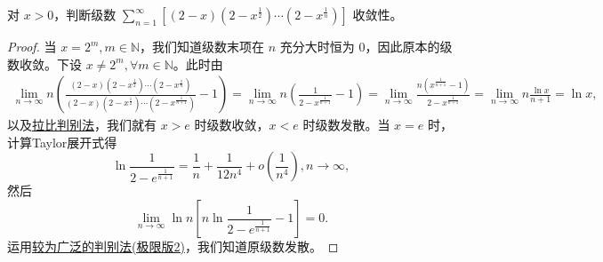 \documentclass[../../main.tex]{subfiles}
\begin{document}
\begin{example}
对 \( x > 0 \)，判断级数 \( \sum_{n = 1}^{\infty} \left[ (2 - x) \left( 2 - x^{\frac{1}{2}} \right) \cdots \left( 2 - x^{\frac{1}{n}} \right) \right] \) 收敛性。
\end{example}
\begin{proof}
当 \( x = 2^m, m \in \mathbb{N} \)，我们知道级数末项在 \( n \) 充分大时恒为 0，因此原本的级数收敛。下设 \( x \neq 2^m, \forall m \in \mathbb{N} \)。此时由
\begin{align*}
\lim_{n \to \infty} n \left( \frac{(2 - x) \left( 2 - x^{\frac{1}{2}} \right) \cdots \left( 2 - x^{\frac{1}{n}} \right)}{(2 - x) \left( 2 - x^{\frac{1}{2}} \right) \cdots \left( 2 - x^{\frac{1}{n + 1}} \right)} - 1 \right) = \lim_{n \to \infty} n \left( \frac{1}{2 - x^{\frac{1}{n + 1}}} - 1 \right)= \lim_{n \to \infty} \frac{n \left( x^{\frac{1}{n + 1}} - 1 \right)}{2 - x^{\frac{1}{n + 1}}} = \lim_{n \to \infty} n \frac{\ln x}{n + 1} = \ln x,
\end{align*}
以及\hyperref[theorem:拉比判别法]{拉比判别法}，我们就有 \( x > e \) 时级数收敛，\( x < e \) 时级数发散。当 \( x = e \) 时，计算Taylor展开式得
\[
\ln \frac{1}{2 - e^{\frac{1}{n + 1}}} = \frac{1}{n} + \frac{1}{12 n^4} + o \left( \frac{1}{n^4} \right), n \to \infty,
\]
然后
\[
\lim_{n \to \infty} \ln n \left[ n \ln \frac{1}{2 - e^{\frac{1}{n + 1}}} - 1 \right] = 0.
\]
运用\hyperref[theorem:较为广泛的判别法]{较为广泛的判别法(极限版2)}，我们知道原级数发散。
\end{proof}
\end{document}
